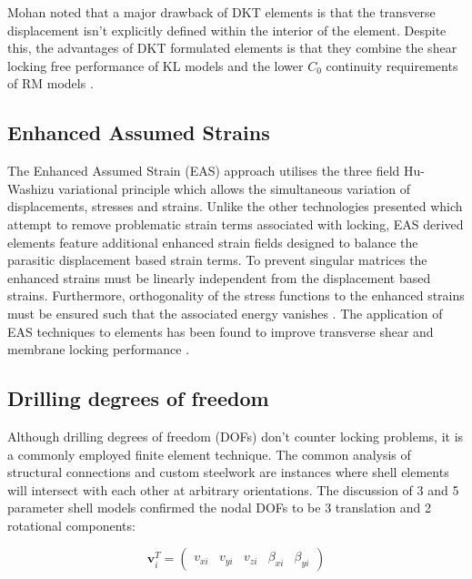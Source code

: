 Mohan \cite{Mohan97} noted that a major drawback of DKT elements is that the transverse displacement isn't explicitly defined within the interior of the element. Despite this, the advantages of DKT formulated elements is that they combine the shear locking free performance of KL models and the lower $C_0$ continuity requirements of RM models \cite{Bletz16}.

\subsection{Enhanced Assumed Strains}

The Enhanced Assumed Strain (EAS) approach \cite{Simo1990} utilises the three field Hu-Washizu variational principle which allows the simultaneous variation of displacements, stresses and strains. Unlike the other technologies presented which attempt to remove problematic strain terms associated with locking, EAS derived elements feature additional enhanced strain fields designed to balance the parasitic displacement based strain terms. To prevent singular matrices the enhanced strains must be linearly independent from the displacement based strains. Furthermore, orthogonality of the stress functions to the enhanced strains must be ensured such that the associated energy vanishes \cite{Echter13}. The application of EAS techniques to elements has been found to improve transverse shear and membrane locking performance \cite{Simo1990} \cite{BischLitBook04} \cite{Echter13}.

\subsection{Drilling degrees of freedom} \label{drilling_DOF_section}

Although drilling degrees of freedom (DOFs) don't counter locking problems, it is a commonly employed finite element technique. The common analysis of structural connections and custom steelwork are instances where shell elements will intersect with each other at arbitrary orientations. The discussion of 3 and 5 parameter shell models confirmed the nodal DOFs to be 3 translation and 2 rotational components:

\begin{equation} 
\mathbf{v}_i^T = \begin{pmatrix}
v_{xi} & v_{yi} & v_{zi} & \beta_{xi} & \beta_{yi}
\end{pmatrix}
\label{eqsdrilling}
\end{equation}

